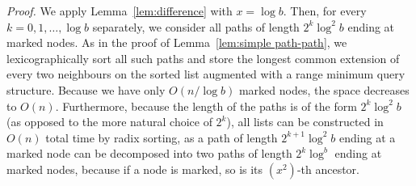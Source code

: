 \documentclass [10pt]{article}
\newenvironment{proof}{\noindent\emph{Proof. }}{}
\begin{document}
\begin{proof}
We apply Lemma~\ref{lem:difference} with $x=\log b$. Then, for every $k=0,1,\ldots,\log b$ separately, we consider all paths of length
$2^{k}\log^{2} b$ ending at marked nodes. As in the proof of Lemma~\ref{lem:simple path-path}, we lexicographically sort all such paths
and store the longest common extension of every two neighbours on the sorted list augmented with a range minimum query structure. Because
we have only $O(n/\log b)$ marked nodes, the space decreases to $O(n)$. Furthermore, because the length of the paths is of the form
$2^{k}\log^{2}b$ (as opposed to the more natural choice of $2^{k}$), all lists can be constructed in $O(n)$ total time by radix sorting, as
a path of length $2^{k+1}\log^{2}b$ ending at a marked node can be decomposed into two paths of length $2^{k}\log^{b}$ ending
at marked nodes, because if a node is marked, so is its $(x^{2})$-th ancestor.


\end{proof}
\end{document}
